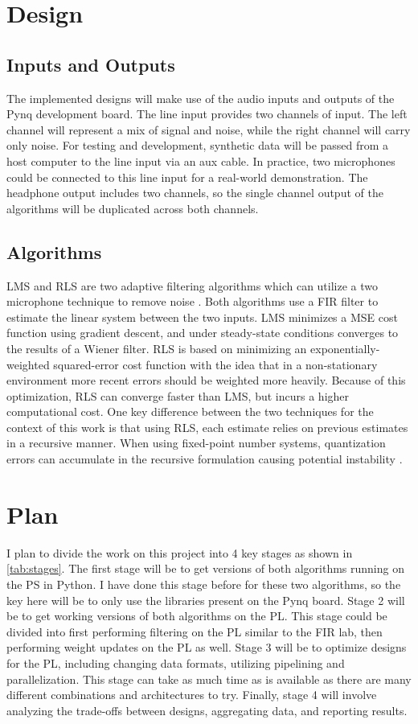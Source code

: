 \documentclass[12pt, letter, twocolumn]{article}
\begin{document}
\section*{Design}%
\label{sec:design}
\subsection*{Inputs and Outputs}
The implemented designs will make use of the audio inputs and outputs of the Pynq development board. The line input provides two channels of input. The left channel will represent a mix of signal and noise, while the right channel will carry only noise. For testing and development, synthetic data will be passed from a host computer to the line input via an aux cable. In practice, two microphones could be connected to this line input for a real-world demonstration. The headphone output includes two channels, so the single channel output of the algorithms will be duplicated across both channels.


\subsection*{Algorithms}
\ac{LMS} and \ac{RLS} are two adaptive filtering algorithms which can utilize a two microphone technique to remove noise \cite{diniz_adaptive_2020}. Both algorithms use a \ac{FIR} filter to estimate the linear system between the two inputs. \ac{LMS} minimizes a \ac{MSE} cost function using gradient descent, and under steady-state conditions converges to the results of a Wiener filter. \ac{RLS} is based on minimizing an exponentially-weighted squared-error cost function with the idea that in a non-stationary environment more recent errors should be weighted more heavily. Because of this optimization, \ac{RLS} can converge faster than \ac{LMS}, but incurs a higher computational cost. One key difference between the two techniques for the context of this work is that using \ac{RLS}, each estimate relies on previous estimates in a recursive manner. When using fixed-point number systems, quantization errors can accumulate in the recursive formulation causing potential instability \cite{adali_steady-state_1999}.

\section*{Plan} 
I plan to divide the work on this project into 4 key stages as shown in \ref{tab:stages}. The first stage will be to get versions of both algorithms running on the \ac{PS} in Python. I have done this stage before for these two algorithms, so the key here will be to only use the libraries present on the Pynq board. Stage 2 will be to get working versions of both algorithms on the \ac{PL}. This stage could be divided into first performing filtering on the PL similar to the FIR lab, then performing weight updates on the PL as well. Stage 3 will be to optimize designs for the \ac{PL}, including changing data formats, utilizing pipelining and parallelization. This stage can take as much time as is available as there are many different combinations and architectures to try. Finally, stage 4 will involve analyzing the trade-offs between designs, aggregating data, and reporting results.
\end{document}
